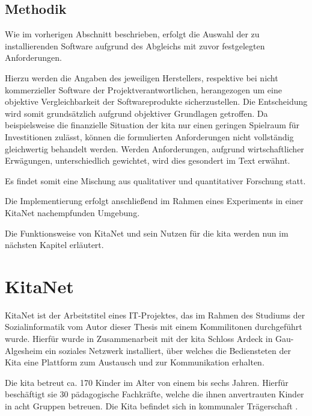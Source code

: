 \section{Methodik}

Wie im vorherigen Abschnitt beschrieben, erfolgt die Auswahl der zu installierenden Software aufgrund des Abgleichs mit zuvor festgelegten Anforderungen.

Hierzu werden die Angaben des jeweiligen Herstellers, respektive bei nicht kommerzieller Software der Projektverantwortlichen, herangezogen um eine objektive Vergleichbarkeit der Softwareprodukte sicherzustellen. Die Entscheidung wird somit grundsätzlich aufgrund objektiver Grundlagen getroffen.  Da beispielsweise die finanzielle Situation der \ac{kita} nur einen geringen Spielraum für Investitionen zulässt, können die formulierten Anforderungen nicht vollständig gleichwertig behandelt werden. Werden Anforderungen, \zb aufgrund wirtschaftlicher Erwägungen, unterschiedlich gewichtet, wird dies gesondert im Text erwähnt.

Es findet somit eine Mischung aus qualitativer und quantitativer Forschung statt.

Die Implementierung erfolgt anschließend im Rahmen eines Experiments in einer KitaNet nachempfunden Umgebung.

Die Funktionsweise von KitaNet und sein Nutzen für die \ac{kita} werden nun im nächsten Kapitel erläutert.

\chapter{KitaNet}
\label{sec:KitaNet}

KitaNet ist der Arbeitstitel eines IT-Projektes, das im Rahmen des Studiums der Sozialinformatik vom Autor dieser Thesis mit einem Kommilitonen durchgeführt wurde. Hierfür wurde in Zusammenarbeit mit der \ac{kita} Schloss Ardeck in Gau-Algesheim ein soziales Netzwerk installiert, über welches die Bediensteten der Kita eine Plattform zum Austausch und zur Kommunikation erhalten. 

Die \ac{kita} betreut ca. 170 Kinder im Alter von einem bis sechs Jahren. Hierfür beschäftigt sie 30 pädagogische Fachkräfte, welche die ihnen anvertrauten Kinder in acht Gruppen betreuen. Die Kita befindet sich in kommunaler Trägerschaft \citep[vgl.][]{kitaweb}.

